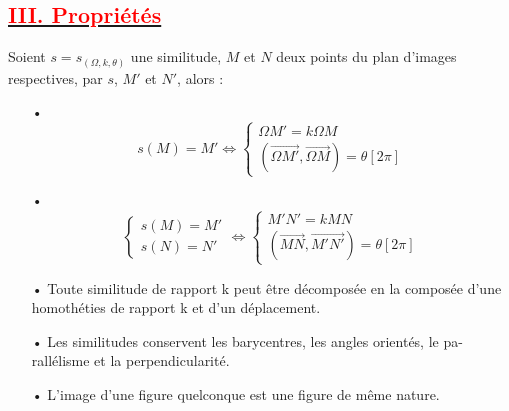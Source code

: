 \documentclass[12pt]{article}
\begin{document}
\subsection*{\underline{\textbf{\textcolor{red}{III. Propriétés}}}}
Soient $s = s_{(\Omega,k,\theta)}$ une similitude, $M$ et $N$ deux points du plan d'images respectives, par $s$, $M'$ et $N'$, alors :
\begin{itemize}
\item[•]
\[
s(M)=M'\Leftrightarrow \begin{cases}
    \Omega M' = k\Omega M \\
    (\overrightarrow{\Omega M'},\overrightarrow{\Omega M})= \theta[2\pi]
\end{cases}
\]
\item[•]
\[
\begin{cases}
    s(M) = M' \\
    s(N) = N'
\end{cases}
\Leftrightarrow 
\begin{cases}
   M'N'=kMN \\
   (\overrightarrow{MN},\overrightarrow{M'N'})=\theta[2\pi]
\end{cases}\]
\item[•] Toute similitude de rapport k peut être décomposée en la composée
d’une homothéties de rapport k et d’un déplacement.
\item[•] Les similitudes conservent les barycentres, les angles orientés, le pa-
rallélisme et la perpendicularité.
\item[•] L’image d’une figure quelconque est une figure de même nature.
\end{itemize}
\end{document}

